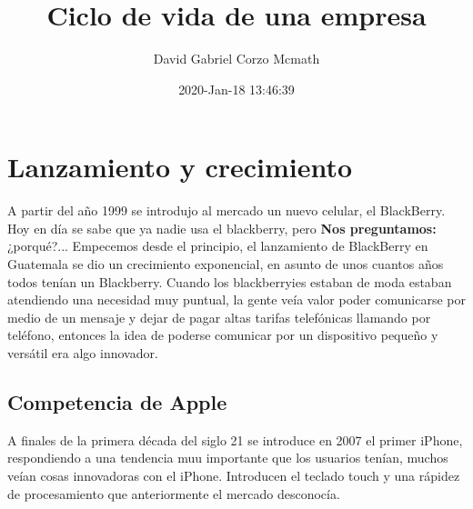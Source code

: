 \documentclass{article}
\title{Ciclo de vida de una empresa}
\author{David Gabriel Corzo Mcmath}
\date{2020-Jan-18 13:46:39}
\begin{document}
\maketitle


\section{Lanzamiento y crecimiento}
A partir del año 1999 se introdujo al mercado un nuevo celular, el BlackBerry. Hoy en día se sabe que ya nadie usa el blackberry, pero \textbf{Nos preguntamos:} ¿porqué?... 
Empecemos desde el principio, el lanzamiento de BlackBerry en Guatemala se dio un crecimiento exponencial, en asunto de unos cuantos años todos tenían un Blackberry. Cuando los blackberryies estaban de moda estaban atendiendo una necesidad muy puntual, la gente veía valor poder comunicarse por medio de un mensaje y dejar de pagar altas tarifas telefónicas llamando por teléfono, entonces la idea de poderse comunicar por un dispositivo pequeño y versátil era algo innovador.

\subsection{Competencia de Apple}
A finales de la primera década del siglo 21 se introduce en 2007 el primer iPhone, respondiendo a una tendencia muu importante que los usuarios tenían, muchos veían cosas innovadoras con el iPhone. Introducen el teclado touch y una rápidez de procesamiento que anteriormente el mercado desconocía.
\end{document}
